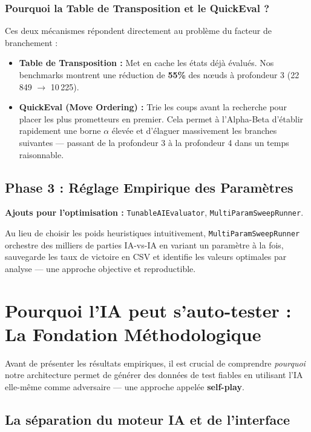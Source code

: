 \documentclass[12pt, a4paper]{article}
\begin{document}
\subsubsection{Pourquoi la Table de Transposition et le QuickEval ?}
Ces deux m\'ecanismes r\'epondent directement au probl\`eme du facteur de branchement :
\begin{itemize}
    \item \textbf{Table de Transposition :} Met en cache les \'etats d\'ej\`a \'evalu\'es. Nos benchmarks montrent une r\'eduction de \textbf{55\%} des n\oe{}uds \`a profondeur 3 (22\,849 $\to$ 10\,225).
    \item \textbf{QuickEval (Move Ordering) :} Trie les coups avant la recherche pour placer les plus prometteurs en premier. Cela permet \`a l'Alpha-Beta d'\'etablir rapidement une borne $\alpha$ \'elev\'ee et d'\'elaguer massivement les branches suivantes --- passant de la profondeur 3 \`a la profondeur 4 dans un temps raisonnable.
\end{itemize}

\subsection{Phase 3 : R\'eglage Empirique des Param\`etres}

\textbf{Ajouts pour l'optimisation :} \texttt{TunableAIEvaluator}, \texttt{MultiParamSweepRunner}.

Au lieu de choisir les poids heuristiques intuitivement, \texttt{MultiParamSweepRunner} orchestre des milliers de parties IA-vs-IA en variant un param\`etre \`a la fois, sauvegarde les taux de victoire en CSV et identifie les valeurs optimales par analyse --- une approche objective et reproductible.


\section{Pourquoi l'IA peut s'auto-tester : La Fondation M\'ethodologique}

Avant de pr\'esenter les r\'esultats empiriques, il est crucial de comprendre \textit{pourquoi} notre architecture permet de g\'en\'erer des donn\'ees de test fiables en utilisant l'IA elle-m\^eme comme adversaire --- une approche appel\'ee \textbf{self-play}.

\subsection{La s\'eparation du moteur IA et de l'interface}
\end{document}
